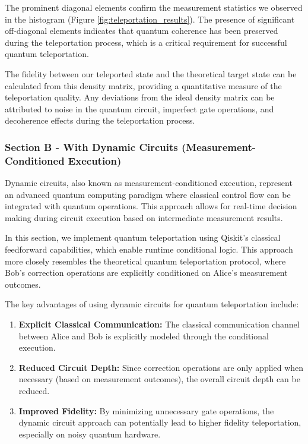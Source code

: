 \documentclass[12pt,a4paper]{article}
\begin{document}
The prominent diagonal elements confirm the measurement statistics we observed in the histogram (Figure \ref{fig:teleportation_results}). The presence of significant off-diagonal elements indicates that quantum coherence has been preserved during the teleportation process, which is a critical requirement for successful quantum teleportation.

The fidelity between our teleported state and the theoretical target state can be calculated from this density matrix, providing a quantitative measure of the teleportation quality. Any deviations from the ideal density matrix can be attributed to noise in the quantum circuit, imperfect gate operations, and decoherence effects during the teleportation process.


\subsubsection{Section B - With Dynamic Circuits (Measurement-Conditioned Execution)}

Dynamic circuits, also known as measurement-conditioned execution, represent an advanced quantum computing paradigm where classical control flow can be integrated with quantum operations. This approach allows for real-time decision making during circuit execution based on intermediate measurement results.

In this section, we implement quantum teleportation using Qiskit's classical feedforward capabilities, which enable runtime conditional logic. This approach more closely resembles the theoretical quantum teleportation protocol, where Bob's correction operations are explicitly conditioned on Alice's measurement outcomes.

The key advantages of using dynamic circuits for quantum teleportation include:

\begin{enumerate}
    \item \textbf{Explicit Classical Communication:} The classical communication channel between Alice and Bob is explicitly modeled through the conditional execution.
    
    \item \textbf{Reduced Circuit Depth:} Since correction operations are only applied when necessary (based on measurement outcomes), the overall circuit depth can be reduced.
    
    \item \textbf{Improved Fidelity:} By minimizing unnecessary gate operations, the dynamic circuit approach can potentially lead to higher fidelity teleportation, especially on noisy quantum hardware.
\end{enumerate}
\end{document}
